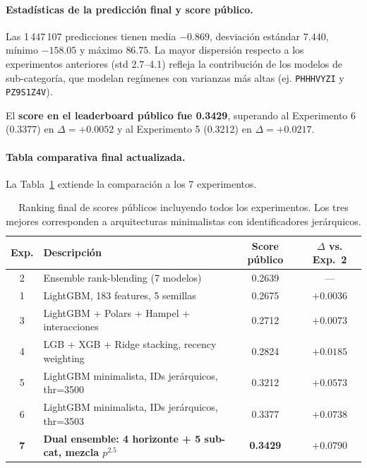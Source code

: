 \documentclass{article}
\begin{document}
\paragraph{Estadísticas de la predicción final y score público.}
Las 1\,447\,107 predicciones tienen media $-0.869$, desviación estándar $7.440$, mínimo $-158.05$ y máximo $86.75$. La mayor dispersión respecto a los experimentos anteriores (std 2.7–4.1) refleja la contribución de los modelos de sub-categoría, que modelan regímenes con varianzas más altas (ej. \texttt{PHHHVYZI} y \texttt{PZ9S1Z4V}).

El \textbf{score en el leaderboard público fue 0.3429}, superando al Experimento 6 (0.3377) en $\Delta = +0.0052$ y al Experimento 5 (0.3212) en $\Delta = +0.0217$.

\paragraph{Tabla comparativa final actualizada.}
La Tabla~\ref{tab:resumen_final_7} extiende la comparación a los 7 experimentos.

\begin{table}[h!]
  \caption{Ranking final de scores públicos incluyendo todos los experimentos. Los tres mejores corresponden a arquitecturas minimalistas con identificadores jerárquicos.}
  \label{tab:resumen_final_7}
  \centering
  \begin{tabular}{clcc}
    \toprule
    Exp. & Descripción & Score público & $\Delta$ vs. Exp.~2 \\
    \midrule
    2 & Ensemble rank-blending (7 modelos)                          & 0.2639 & --- \\
    1 & LightGBM, 183 features, 5 semillas                          & 0.2675 & $+0.0036$ \\
    3 & LightGBM + Polars + Hampel + interacciones                  & 0.2712 & $+0.0073$ \\
    4 & LGB + XGB + Ridge stacking, recency weighting               & 0.2824 & $+0.0185$ \\
    5 & LightGBM minimalista, IDs jerárquicos, thr=3500             & 0.3212 & $+0.0573$ \\
    6 & LightGBM minimalista, IDs jerárquicos, thr=3503             & 0.3377 & $+0.0738$ \\
    \textbf{7} & \textbf{Dual ensemble: 4 horizonte + 5 sub-cat, mezcla $p^{2.5}$} & \textbf{0.3429} & $\mathbf{+0.0790}$ \\
    \bottomrule
  \end{tabular}
\end{table}
\end{document}
